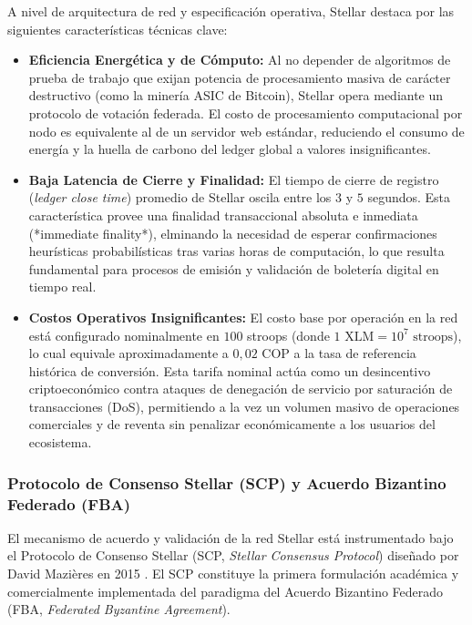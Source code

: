 A nivel de arquitectura de red y especificación operativa, Stellar destaca por las siguientes características técnicas clave:
\begin{itemize}\setlength{\itemsep}{2pt}
    \item \textbf{Eficiencia Energética y de Cómputo:} Al no depender de algoritmos de prueba de trabajo que exijan potencia de procesamiento masiva de carácter destructivo (como la minería ASIC de Bitcoin), Stellar opera mediante un protocolo de votación federada. El costo de procesamiento computacional por nodo es equivalente al de un servidor web estándar, reduciendo el consumo de energía y la huella de carbono del ledger global a valores insignificantes.
    \item \textbf{Baja Latencia de Cierre y Finalidad:} El tiempo de cierre de registro (\textit{ledger close time}) promedio de Stellar oscila entre los $3$ y $5$ segundos. Esta característica provee una finalidad transaccional absoluta e inmediata (*immediate finality*), elminando la necesidad de esperar confirmaciones heurísticas probabilísticas tras varias horas de computación, lo que resulta fundamental para procesos de emisión y validación de boletería digital en tiempo real.
    \item \textbf{Costos Operativos Insignificantes:} El costo base por operación en la red está configurado nominalmente en $100$ stroops (donde $1\text{ XLM} = 10^{7}\text{ stroops}$), lo cual equivale aproximadamente a $0{,}02\text{ COP}$ a la tasa de referencia histórica de conversión. Esta tarifa nominal actúa como un desincentivo criptoeconómico contra ataques de denegación de servicio por saturación de transacciones (DoS), permitiendo a la vez un volumen masivo de operaciones comerciales y de reventa sin penalizar económicamente a los usuarios del ecosistema.
\end{itemize}

\subsubsection{Protocolo de Consenso Stellar (SCP) y Acuerdo Bizantino Federado (FBA)}

El mecanismo de acuerdo y validación de la red Stellar está instrumentado bajo el Protocolo de Consenso Stellar (SCP, \textit{Stellar Consensus Protocol}) diseñado por David Mazières en 2015 \cite{mazieres2015stellar}. El SCP constituye la primera formulación académica y comercialmente implementada del paradigma del Acuerdo Bizantino Federado (FBA, \textit{Federated Byzantine Agreement}). 

